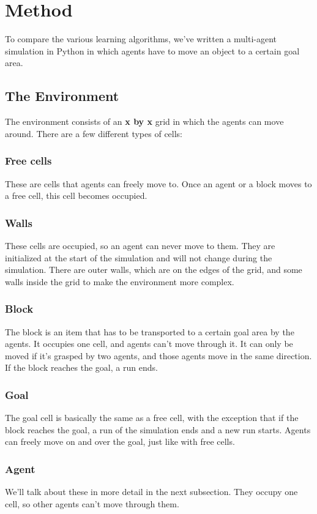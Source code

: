 \section{Method}
To compare the various learning algorithms, we've written a multi-agent simulation in Python in which agents have to move an object to a certain goal area.
\subsection{The Environment}
The environment consists of an \textbf{x by x} grid in which the agents can move around. There are a few different types of cells:
\subsubsection*{Free cells}
These are cells that agents can freely move to. Once an agent or a block moves to a free cell, this cell becomes occupied.
\subsubsection*{Walls}
These cells are occupied, so an agent can never move to them. They are initialized at the start of the simulation and will not change during the simulation. There are outer walls, which are on the edges of the grid, and some walls inside the grid to make the environment more complex.
\subsubsection*{Block}
The block is an item that has to be transported to a certain goal area by the agents. It occupies one cell, and agents can't move through it. It can only be moved if it's grasped by two agents, and those agents move in the same direction. If the block reaches the goal, a run ends.
\subsubsection*{Goal}
The goal cell is basically the same as a free cell, with the exception that if the block reaches the goal, a run of the simulation ends and a new run starts. Agents can freely move on and over the goal, just like with free cells.
\subsubsection*{Agent}
We'll talk about these in more detail in the next subsection. They occupy one cell, so other agents can't move through them.
